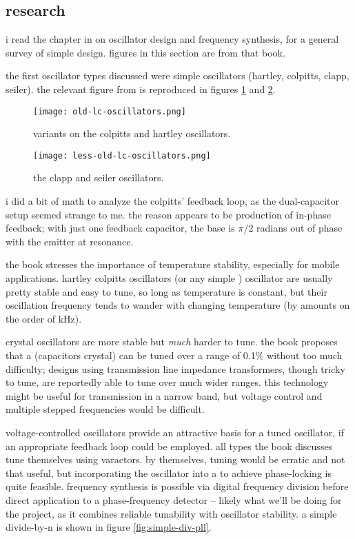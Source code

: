 \subsection*{research}
i read the chapter in \autocite{experimental-rf} on oscillator design and
frequency synthesis, for a general survey of simple \vco design. figures in
this section are from that book.

the first oscillator types discussed were simple \lc oscillators (hartley,
colpitts, clapp, seiler). the relevant figure from \autocite{experimental-rf}
is reproduced in figures \ref{fig:old-lc-oscillators} and
\ref{fig:less-old-lc-oscillators}.

\begin{figure}[H]
	\centering
	\texttt{[image: old-lc-oscillators.png]}
	\caption{variants on the colpitts and hartley oscillators.}
	\label{fig:old-lc-oscillators}
\end{figure}

\begin{figure}[H]
	\centering
	\texttt{[image: less-old-lc-oscillators.png]}
	\caption{the clapp and seiler oscillators.}
	\label{fig:less-old-lc-oscillators}
\end{figure}

i did a bit of math to analyze the colpitts' feedback loop, as the
dual-capacitor setup seemed strange to me. the reason appears to be production
of in-phase feedback; with just one feedback capacitor, the base is \(\pi/2\)
radians out of phase with the emitter at resonance.

the book stresses the importance of temperature stability, especially for
mobile applications. hartley \amp colpitts oscillators (or any simple \lc)
oscillator are usually pretty stable and easy to tune, so long as temperature
is constant, but their oscillation frequency tends to wander with changing
temperature (by amounts on the order of kHz).

crystal oscillators are more stable but \emph{much} harder to tune. the book
proposes that a \vxo (capacitors \amp crystal) can be tuned over a range of
0.1\% without too much difficulty; designs using transmission line impedance
transformers, though tricky to tune, are reportedly able to tune over much
wider ranges. this technology might be useful for \fm transmission in a narrow
band, but voltage control and multiple stepped frequencies would be difficult.

voltage-controlled \lc oscillators provide an attractive basis for a tuned
oscillator, if an appropriate feedback loop could be employed. all types the
book discusses tune themselves using varactors. by themselves, tuning would be
erratic and not that useful, but incorporating the oscillator into a \pll to
achieve phase-locking is quite feasible. frequency synthesis is possible via
digital frequency division before direct application to a phase-frequency
detector -- likely what we'll be doing for the project, as it combines reliable
tunability with oscillator stability. a simple divide-by-n \pll is shown in
figure \ref{fig:simple-div-pll}.

